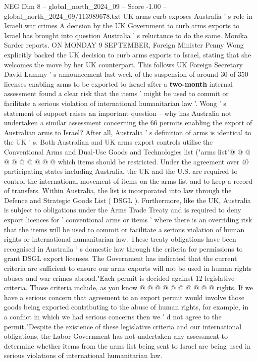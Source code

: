 \begin{textsample}{NEG Dim 8 – global\_north\_2024\_09 – Score -1.00 – global\_north\_2024\_09/113989678.txt}  \label{ex:f8_neg_371}
UK arms curb exposes Australia ' s role in Israeli war crimes A decision by the UK Government to curb arms exports to Israel has brought into question Australia ' s reluctance to do the same.
Monika Sarder reports.
ON MONDAY 9 SEPTEMBER, Foreign Minister Penny Wong explicitly backed the UK decision to curb arms exports to Israel, stating that she welcomes the move by her UK counterpart.
This follows UK Foreign Secretary David Lammy ' s announcement last week of the suspension of around 30 of 350 licenses enabling arms to be exported to Israel after a \textbf{two-month} internal assessment found a clear risk that the items ' might be used to commit or facilitate a serious violation of international humanitarian law '.
Wong ' s statement of support raises an important question -- why has Australia not undertaken a similar assessment concerning the 66 permits enabling the export of Australian arms to Israel?
After all, Australia ' s definition of arms is identical to the UK ' s.
Both Australian and UK arms export controls utilise the Conventional Arms and Dual-Use Goods and Technologies list ("arms list"@ @ @ @ @ @ @ @ @ @ which items should be restricted.
Under the agreement over 40 participating states including Australia, the UK and the U.S. are required to control the international movement of items on the arms list and to keep a record of transfers.
Within Australia, the list is incorporated into law through the Defence and Strategic Goods List ( DSGL ).
Furthermore, like the UK, Australia is subject to obligations under the Arms Trade Treaty and is required to deny export licences for ' conventional arms or items ' where there is an overriding risk that the items will be used to commit or facilitate a serious violation of human rights or international humanitarian law.
These treaty obligations have been recognised in Australia ' s domestic law through the criteria for permissions to grant DSGL export licenses.
The Government has indicated that the current criteria are sufficient to ensure our arms exports will not be used in human rights abuses and war crimes abroad."Each permit is decided against 12 legislative criteria.
Those criteria include, as you know @ @ @ @ @ @ @ @ @ @ rights.
If we have a serious concern that agreement to an export permit would involve those goods being exported contributing to the abuse of human rights, for example, in a conflict in which we had serious concerns then we ' d not agree to the permit."Despite the existence of these legislative criteria and our international obligations, the Labor Government has not undertaken any assessment to determine whether items from the arms list being sent to Israel are being used in serious violations of international humanitarian law.

\end{textsample}
